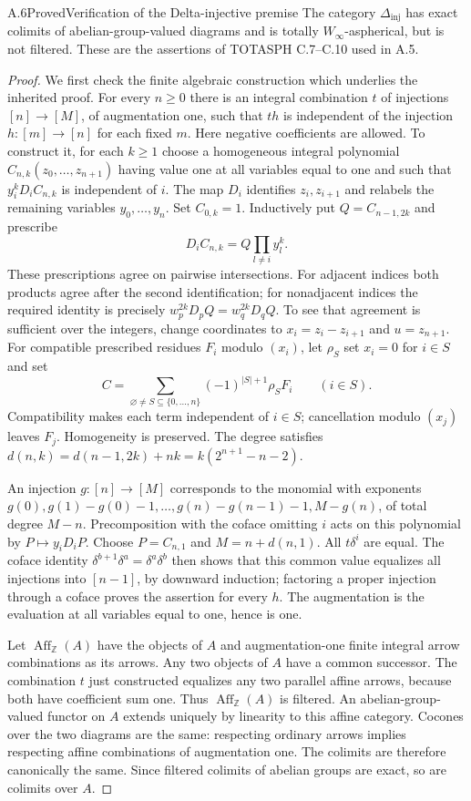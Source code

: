 \begin{result}{A.6}{Proved}{Verification of the Delta-injective premise}
The category $\Delta_{\mathrm{inj}}$ has exact colimits of
abelian-group-valued diagrams and is totally $W_\infty$-aspherical,
but is not filtered. These are the assertions of TOTASPH C.7--C.10
used in A.5.
\end{result}
\begin{proof}
We first check the finite algebraic construction which underlies the
inherited proof. For every $n\geq0$ there is an integral combination
$t$ of injections $[n]\to[M]$, of augmentation one, such that $th$
is independent of the injection $h:[m]\to[n]$ for each fixed $m$.
Here negative coefficients are allowed. To construct it, for each
$k\geq1$ choose a homogeneous integral polynomial
$C_{n,k}(z_0,\ldots,z_{n+1})$ having value one at all variables equal
to one and such that $y_i^kD_iC_{n,k}$ is independent of $i$.
The map $D_i$ identifies $z_i,z_{i+1}$ and relabels the remaining
variables $y_0,\ldots,y_n$. Set $C_{0,k}=1$. Inductively put
$Q=C_{n-1,2k}$ and prescribe
\[
 D_i C_{n,k}=Q\prod_{l\ne i}y_l^k.
\]
These prescriptions agree on pairwise intersections. For adjacent
indices both products agree after the second identification; for
nonadjacent indices the required identity is precisely
$w_p^{2k}D_pQ=w_q^{2k}D_qQ$. To see that agreement is sufficient
over the integers, change coordinates to
$x_i=z_i-z_{i+1}$ and $u=z_{n+1}$. For compatible prescribed residues
$F_i$ modulo $(x_i)$, let $\rho_S$ set $x_i=0$ for $i\in S$ and set
\[
 C=\sum_{\varnothing\ne S\subseteq\{0,\ldots,n\}}
             (-1)^{|S|+1}\rho_S F_i\qquad(i\in S).
\]
Compatibility makes each term independent of $i\in S$; cancellation
modulo $(x_j)$ leaves $F_j$. Homogeneity is preserved. The degree
satisfies $d(n,k)=d(n-1,2k)+nk=k(2^{n+1}-n-2)$.

An injection $g:[n]\to[M]$ corresponds to the monomial with exponents
$g(0),g(1)-g(0)-1,\ldots,g(n)-g(n-1)-1,M-g(n)$, of total degree
$M-n$. Precomposition with the coface omitting $i$ acts on this
polynomial by $P\mapsto y_iD_iP$. Choose $P=C_{n,1}$ and
$M=n+d(n,1)$. All $t\delta^i$ are equal. The coface identity
$\delta^{b+1}\delta^a=\delta^a\delta^b$ then shows that this common
value equalizes all injections into $[n-1]$, by downward induction;
factoring a proper injection through a coface proves the assertion
for every $h$. The augmentation is the evaluation at all variables
equal to one, hence is one.

Let $\operatorname{Aff}_{\mathbb Z}(A)$ have the objects of $A$ and
augmentation-one finite integral arrow combinations as its arrows.
Any two objects of $A$ have a common successor. The combination $t$
just constructed equalizes any two parallel affine arrows, because
both have coefficient sum one. Thus $\operatorname{Aff}_{\mathbb Z}(A)$
is filtered. An abelian-group-valued functor on $A$ extends uniquely
by linearity to this affine category. Cocones over the two diagrams
are the same: respecting ordinary arrows implies respecting affine
combinations of augmentation one. The colimits are therefore
canonically the same. Since filtered colimits of abelian groups are
exact, so are colimits over $A$.


\end{proof}
